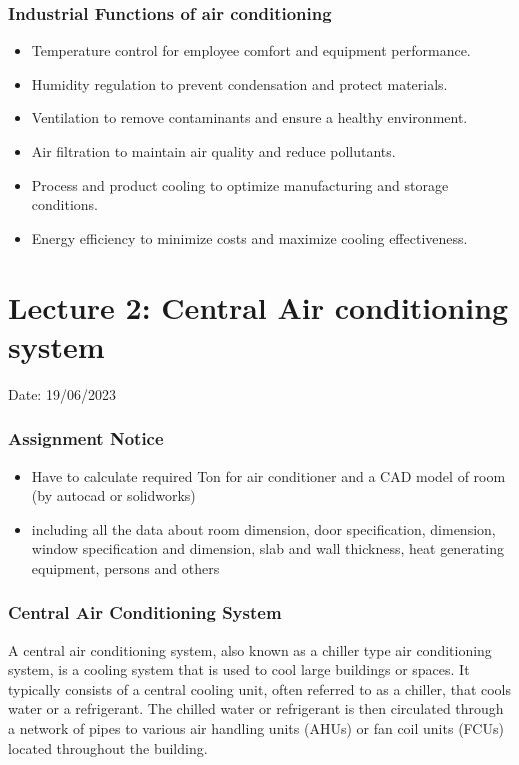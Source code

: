 \documentclass{article}
\begin{document}
\subsubsection*{Industrial Functions of air conditioning}
\begin{itemize}
  \item Temperature control for employee comfort and equipment performance.
  \item Humidity regulation to prevent condensation and protect materials.
  \item Ventilation to remove contaminants and ensure a healthy environment.
  \item Air filtration to maintain air quality and reduce pollutants.
  \item Process and product cooling to optimize manufacturing and storage conditions.
  \item Energy efficiency to minimize costs and maximize cooling effectiveness.
\end{itemize}

\newpage

\section{Lecture 2: Central Air conditioning system}
\hfill Date: 19/06/2023

\subsubsection*{Assignment Notice}
\begin{itemize}
  \item Have to calculate required Ton for air conditioner and a CAD model of room (by autocad or solidworks)
  \item including all the data about room dimension, door specification, dimension, window specification and dimension, slab and wall thickness, heat generating equipment, persons and others 
\end{itemize}

\subsubsection*{Central Air Conditioning System}
A central air conditioning system, also known as a chiller type air conditioning system, is a cooling system that is used to cool large buildings or spaces. It typically consists of a central cooling unit, often referred to as a chiller, that cools water or a refrigerant. The chilled water or refrigerant is then circulated through a network of pipes to various air handling units (AHUs) or fan coil units (FCUs) located throughout the building.
\end{document}
